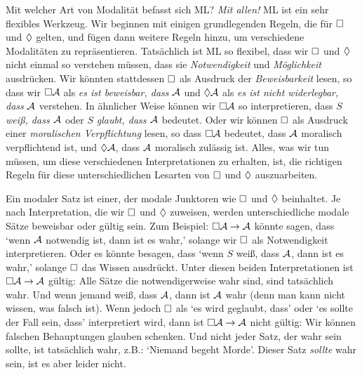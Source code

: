 Mit welcher Art von Modalität befasst sich ML? \emph{Mit allen!} ML ist ein sehr flexibles Werkzeug. Wir beginnen mit einigen grundlegenden Regeln, die für $\Box$ und $\Diamond$ gelten, und fügen dann weitere Regeln hinzu, um verschiedene Modalitäten zu repräsentieren. Tatsächlich ist ML so flexibel, dass wir $\Box$ und $\Diamond$ nicht einmal so verstehen müssen, dass sie \emph{Notwendigkeit} und \emph{Möglichkeit} ausdrücken. Wir könnten stattdessen $\Box$ als Ausdruck der \emph{Beweisbarkeit} lesen, so dass wir $\Box\mathcal{A}$ als \emph{es ist beweisbar, dass} $\mathcal{A}$ und $\Diamond\mathcal{A}$ als \emph{es ist nicht widerlegbar, dass} $\mathcal{A}$ verstehen. In ähnlicher Weise können wir $\Box\mathcal{A}$ so interpretieren, dass $S$ \emph{weiß, dass $\mathcal{A}$} oder $S$ \emph{glaubt, dass $\mathcal{A}$} bedeutet. Oder wir können $\Box$ als Ausdruck einer \emph{moralischen Verpflichtung} lesen, so dass $\Box \mathcal{A}$ bedeutet, dass $\mathcal{A}$ moralisch verpflichtend ist, und $\Diamond \mathcal{A}$, dass $\mathcal{A}$ moralisch zulässig ist. Alles, was wir tun müssen, um diese verschiedenen Interpretationen zu erhalten, ist, die richtigen Regeln für diese unterschiedlichen Lesarten von $\Box$ und $\Diamond$ auszuarbeiten.

Ein modaler Satz ist einer, der modale Junktoren wie $\Box$ und $\Diamond$ beinhaltet. Je nach Interpretation, die wir $\Box$ und $\Diamond$ zuweisen, werden unterschiedliche modale Sätze beweisbar oder gültig sein. Zum Beispiel: $\Box \mathcal{A} \rightarrow \mathcal{A}$ könnte sagen, dass `wenn $\mathcal{A}$ notwendig ist, dann ist es wahr,' solange wir $\Box$ als Notwendigkeit interpretieren. Oder es könnte besagen, dass `wenn $S$ weiß, dass $\mathcal{A}$, dann ist es wahr,' solange $\Box$ das Wissen ausdrückt. Unter diesen beiden Interpretationen ist $\Box\mathcal{A} \rightarrow \mathcal{A}$ gültig: Alle Sätze die notwendigerweise wahr sind, sind tatsächlich wahr. Und wenn jemand weiß, dass $\mathcal{A}$, dann ist $\mathcal{A}$ wahr (denn man kann nicht wissen, was falsch ist). Wenn jedoch $\Box$ als `es wird geglaubt, dass' oder `es sollte der Fall sein, dass' interpretiert wird, dann ist $\Box\mathcal{A} \rightarrow \mathcal{A}$ nicht gültig: Wir können falschen Behauptungen glauben schenken. Und nicht jeder Satz, der wahr sein sollte, ist tatsächlich wahr, z.B.\@: `Niemand begeht Morde'. Dieser Satz \emph{sollte} wahr sein, ist es aber leider nicht. 

